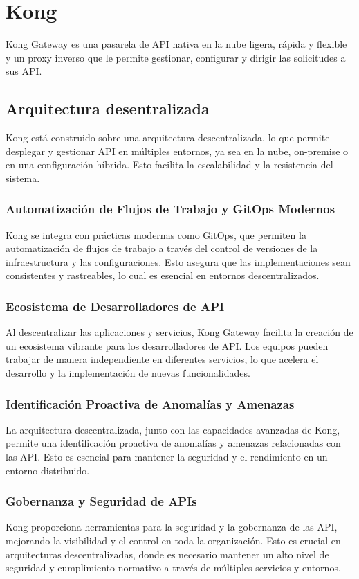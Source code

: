 \section{Kong}
Kong Gateway es una pasarela de API nativa en la nube ligera, rápida 
y flexible y un proxy inverso que le permite gestionar, configurar y 
dirigir las solicitudes a sus API. \cite{kong-api-gateway}

\subsection{Arquitectura desentralizada}
Kong está construido sobre una arquitectura descentralizada, 
lo que permite desplegar y gestionar API en múltiples entornos, 
ya sea en la nube, on-premise o en una configuración híbrida. 
Esto facilita la escalabilidad y la resistencia del sistema.


\subsubsection{Automatización de Flujos de Trabajo y GitOps Modernos}
Kong se integra con prácticas modernas como GitOps, que permiten la automatización de 
flujos de trabajo a través del control de versiones de la infraestructura y las configuraciones. 
Esto asegura que las implementaciones sean consistentes y rastreables, lo cual es esencial en entornos descentralizados.

\subsubsection{Ecosistema de Desarrolladores de API}
Al descentralizar las aplicaciones y servicios, Kong Gateway facilita la creación 
de un ecosistema vibrante para los desarrolladores de API. Los equipos pueden 
trabajar de manera independiente en diferentes servicios, lo que acelera el 
desarrollo y la implementación de nuevas funcionalidades.

\subsubsection{Identificación Proactiva de Anomalías y Amenazas}
La arquitectura descentralizada, junto con las capacidades avanzadas de Kong, 
permite una identificación proactiva de anomalías y amenazas 
relacionadas con las API. Esto es esencial para mantener 
la seguridad y el rendimiento en un entorno distribuido.

\subsubsection{Gobernanza y Seguridad de APIs}
Kong proporciona herramientas para la seguridad y la gobernanza de las API, 
mejorando la visibilidad y el control en toda la organización. 
Esto es crucial en arquitecturas descentralizadas, donde es necesario mantener un 
alto nivel de seguridad y cumplimiento normativo a través de múltiples servicios y entornos.


